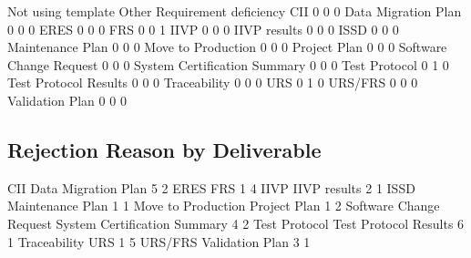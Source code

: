 \documentclass{article}
\begin{document}
\begin{Schunk}
\begin{Soutput}
                               Not using template Other Requirement deficiency
  CII                                           0     0                      0
  Data Migration Plan                           0     0                      0
  ERES                                          0     0                      0
  FRS                                           0     0                      1
  IIVP                                          0     0                      0
  IIVP results                                  0     0                      0
  ISSD                                          0     0                      0
  Maintenance Plan                              0     0                      0
  Move to Production                            0     0                      0
  Project Plan                                  0     0                      0
  Software Change Request                       0     0                      0
  System Certification Summary                  0     0                      0
  Test Protocol                                 0     1                      0
  Test Protocol Results                         0     0                      0
  Traceability                                  0     0                      0
  URS                                           0     1                      0
  URS/FRS                                       0     0                      0
  Validation Plan                               0     0                      0
\end{Soutput}
\end{Schunk}


\subsection{Rejection Reason by Deliverable}

\begin{Schunk}
\begin{Soutput}
                         CII          Data Migration Plan 
                           5                            2 
                        ERES                          FRS 
                           1                            4 
                        IIVP                 IIVP results 
                           2                            1 
                        ISSD             Maintenance Plan 
                           1                            1 
          Move to Production                 Project Plan 
                           1                            2 
     Software Change Request System Certification Summary 
                           4                            2 
               Test Protocol        Test Protocol Results 
                           6                            1 
                Traceability                          URS 
                           1                            5 
                     URS/FRS              Validation Plan 
                           3                            1 
\end{Soutput}
\end{Schunk}
\end{document}
